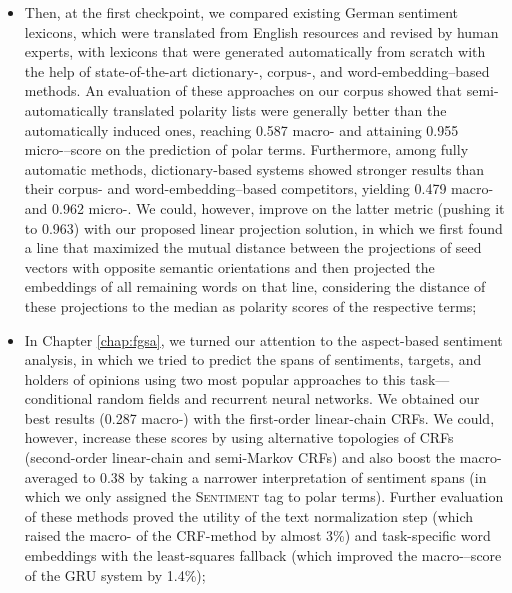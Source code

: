 \begin{itemize}
\item Then, at the first checkpoint, we compared existing German
  sentiment lexicons, which were translated from English resources and
  revised by human experts, with lexicons that were generated
  automatically from scratch with the help of state-of-the-art
  dictionary\mbox{-,} corpus\mbox{-,} and word-embedding--based
  methods.  An evaluation of these approaches on our corpus showed
  that semi-automatically translated polarity lists were generally
  better than the automatically induced ones, reaching 0.587
  macro-\F{} and attaining 0.955 micro-\F{}--score on the prediction
  of polar terms.  Furthermore, among fully automatic methods,
  dictionary-based systems showed stronger results than their corpus-
  and word-embedding--based competitors, yielding 0.479 macro-\F{} and
  0.962 micro-\F{}.  We could, however, improve on the latter metric
  (pushing it to 0.963) with our proposed linear projection solution,
  in which we first found a line that maximized the mutual distance
  between the projections of seed vectors with opposite semantic
  orientations and then projected the embeddings of all remaining
  words on that line, considering the distance of these projections to
  the median as polarity scores of the respective terms;

\item In Chapter \ref{chap:fgsa}, we turned our attention to the
  aspect-based sentiment analysis, in which we tried to predict the
  spans of sentiments, targets, and holders of opinions using two most
  popular approaches to this task---conditional random fields and
  recurrent neural networks.  We obtained our best results (0.287
  macro-\F{}) with the first-order linear-chain CRFs.  We could,
  however, increase these scores by using alternative topologies of
  CRFs (second-order linear-chain and semi-Markov CRFs) and also boost
  the macro-averaged \F{} to 0.38 by taking a narrower interpretation
  of sentiment spans (in which we only assigned the \textsc{Sentiment}
  tag to polar terms).  Further evaluation of these methods proved the
  utility of the text normalization step (which raised the macro-\F{}
  of the CRF-method by almost 3\%) and task-specific word embeddings
  with the least-squares fallback (which improved the
  macro-\F{}--score of the GRU system by 1.4\%);


\end{itemize}
